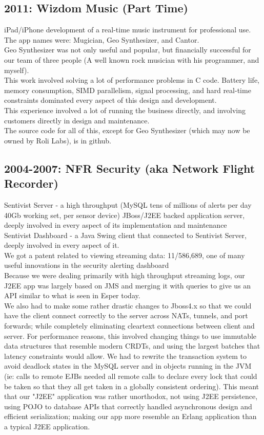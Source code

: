 \documentclass[margin]{res}
\begin{document}
\begin{resume}
\subsection{2011: Wizdom Music (Part Time)}
iPad/iPhone development of a real-time music instrument for professional use. \\
The app names were: Mugician, Geo Synthesizer, and Cantor. \\
Geo Synthesizer was not only useful and popular, but financially successful for our team of three people (A well known rock musician with his programmer, and myself). \\
This work involved solving a lot of performance problems in C code.
Battery life, memory consumption, SIMD parallelism, signal processing,
and hard real-time constraints dominated every aspect of this design
and development. \\
This experience involved a lot of running the business directly, and involving customers directly in design and maintenance. \\
The source code for all of this, except for Geo Synthesizer (which may now be owned by Roli Labs), is in github.

\subsection{2004-2007: NFR Security (aka Network Flight Recorder)}
Sentivist Server - a high throughput (MySQL tens of millions of alerts per day 40Gb working set, per sensor device) JBoss/J2EE backed application server,
deeply involved in every aspect of its implementation and maintenance \\
Sentivist Dashboard - a Java Swing client that connected to Sentivist Server,
deeply involved in every aspect of it. \\
We got a patent related to viewing streaming data: 11/586,689, one
of many useful innovations in the security alerting dashboard \\
Because we were dealing primarily with high throughput streaming logs,
our J2EE app was largely based on JMS and merging it with queries to
give us an API similar to what is seen in Esper today.  \\
We also had to make some rather drastic changes to Jboss4.x so that we could
have the client connect correctly to the server across NATs, tunnels, and port forwards; while completely eliminating cleartext connections between client and server.  For performance reasons, this involved changing things to use immutable data structures that resemble modern CRDTs, and using the largest batches that latency constraints would allow.  We had to rewrite the transaction system
to avoid deadlock states in the MySQL server and in objects running in
the JVM (ie: calls to remote EJBs needed all remote calls to declare every lock that could be taken so that they all get taken in a globally consistent ordering).   This meant that our "J2EE" application was rather unorthodox,
not using J2EE persistence, using POJO to database APIs that correctly handled asynchronous design and efficient serialization; making our app more resemble an Erlang application than a typical J2EE application.


\end{resume}
\end{document}
